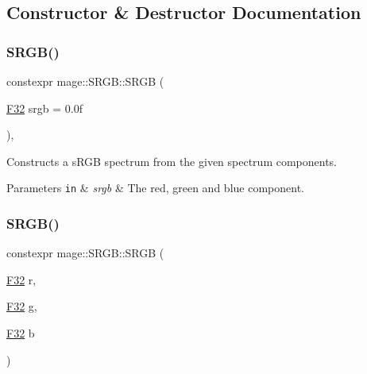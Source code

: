 \subsection{Constructor \& Destructor Documentation}
\hypertarget{structmage_1_1_s_r_g_b_a5f1cc4d90aaa3801f1146eb767d45476}{}\label{structmage_1_1_s_r_g_b_a5f1cc4d90aaa3801f1146eb767d45476} 
\subsubsection{\texorpdfstring{S\+R\+G\+B()}{SRGB()}\hspace{0.1cm}{\footnotesize\ttfamily [1/6]}}
{\footnotesize\ttfamily constexpr mage\+::\+S\+R\+G\+B\+::\+S\+R\+GB (\begin{DoxyParamCaption}\item[{\hyperlink{namespacemage_aa97e833b45f06d60a0a9c4fc22ae02c0}{F32}}]{srgb = {\ttfamily 0.0f} }\end{DoxyParamCaption})\hspace{0.3cm}{\ttfamily [explicit]}, {\ttfamily [noexcept]}}

Constructs a s\+R\+GB spectrum from the given spectrum components.


\begin{DoxyParams}[1]{Parameters}
\mbox{\tt in}  & {\em srgb} & The red, green and blue component. \\
\hline
\end{DoxyParams}
\hypertarget{structmage_1_1_s_r_g_b_acf4eb424d13f8ee60065c3d7e118987b}{}\label{structmage_1_1_s_r_g_b_acf4eb424d13f8ee60065c3d7e118987b} 
\subsubsection{\texorpdfstring{S\+R\+G\+B()}{SRGB()}\hspace{0.1cm}{\footnotesize\ttfamily [2/6]}}
{\footnotesize\ttfamily constexpr mage\+::\+S\+R\+G\+B\+::\+S\+R\+GB (\begin{DoxyParamCaption}\item[{\hyperlink{namespacemage_aa97e833b45f06d60a0a9c4fc22ae02c0}{F32}}]{r,  }\item[{\hyperlink{namespacemage_aa97e833b45f06d60a0a9c4fc22ae02c0}{F32}}]{g,  }\item[{\hyperlink{namespacemage_aa97e833b45f06d60a0a9c4fc22ae02c0}{F32}}]{b }\end{DoxyParamCaption})\hspace{0.3cm}{\ttfamily [noexcept]}}

